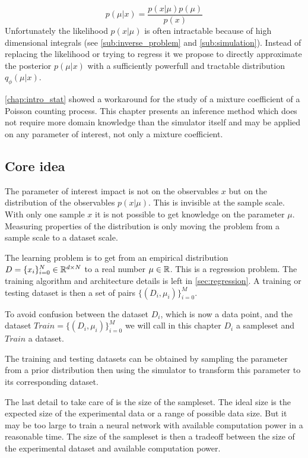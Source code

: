 \begin{equation}
    p(\mu | x) = \frac{p(x | \mu) p(\mu) }{p(x)}
\end{equation}
Unfortunately the likelihood $p(x | \mu)$ is often intractable because of high dimensional integrals (see \autoref{sub:inverse_problem} and \autoref{sub:simulation}).
Instead of replacing the likelihood or trying to regress it we propose to directly approximate the posterior $p(\mu | x)$ with a sufficiently powerfull and tractable distribution $q_\phi(\mu | x)$.

\autoref{chap:intro_stat} showed a workaround for the study of a mixture coefficient of a Poisson counting process.
This chapter presents an inference method which does not require more domain knowledge than the simulator itself and may be applied on any parameter of interest, not only a mixture coefficient.







\subsection{Core idea} %
\label{sub:core_idea}

The parameter of interest impact is not on the observables $x$ but on the distribution of the observables $p(x|\mu)$.
This is invisible at the sample scale.
With only one sample $x$ it is not possible to get knowledge on the parameter $\mu$.
Measuring properties of the distribution is only moving the problem from a sample scale to a dataset scale.

The learning problem is to get from an empirical distribution $D = \{x_i\}_{i=0}^N \in \mathbb{R}^{d\times N}$ to a real number $\mu \in \mathbb{R}$.
This is a regression problem.
The training algorithm and architecture details is left in \autoref{sec:regression}.
A training or testing dataset is then a set of pairs $\{(D_i, \mu_i)\}_{i=0}^M$.

To avoid confusion between the dataset $D_i$, which is now a data point, and the dataset $Train = \{(D_i, \mu_i)\}_{i=0}^M$ we will call in this chapter $D_i$ a sampleset and $Train$ a dataset.

The training and testing datasets can be obtained by sampling the parameter from a prior distribution then using the simulator to transform this parameter to its corresponding dataset.

The last detail to take care of is the size of the sampleset.
The ideal size is the expected size of the experimental data or a range of possible data size.
But it may be too large to train a neural network with available computation power in a reasonable time.
The size of the sampleset is then a tradeoff between the size of the experimental dataset and available computation power.

